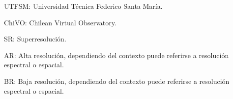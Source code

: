 {\setlength{\parskip}{0cm} %
UTFSM: Universidad Técnica Federico Santa María.

ChiVO: Chilean Virtual Observatory.

SR: Superresolución.

AR: Alta resolución, dependiendo del contexto puede referirse a resolución espectral o espacial.

BR: Baja resolución, dependiendo del contexto puede referirse a resolución espectral o espacial.

}
